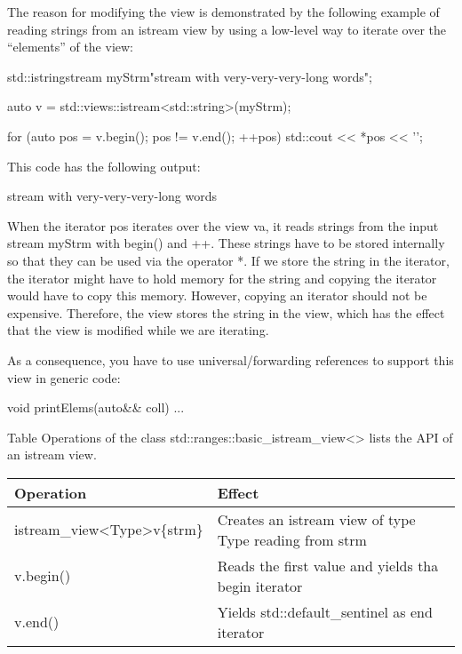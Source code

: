 The reason for modifying the view is demonstrated by the following example of reading strings from an istream view by using a low-level way to iterate over the “elements” of the view:

\begin{cpp}
std::istringstream myStrm{"stream with very-very-very-long words"};

auto v = std::views::istream<std::string>(myStrm);

for (auto pos = v.begin(); pos != v.end(); ++pos) {
	std::cout << *pos << '\n';
}
\end{cpp}

This code has the following output:

\begin{shell}
stream
with
very-very-very-long
words
\end{shell}

When the iterator pos iterates over the view va, it reads strings from the input stream myStrm with begin() and ++. These strings have to be stored internally so that they can be used via the operator *. If we store the string in the iterator, the iterator might have to hold memory for the string and copying the iterator would have to copy this memory. However, copying an iterator should not be expensive. Therefore, the view stores the string in the view, which has the effect that the view is modified while we are iterating.

As a consequence, you have to use universal/forwarding references to support this view in generic code:

\begin{cpp}
void printElems(auto&& coll) {
	...
}
\end{cpp}


Table Operations of the class std::ranges::basic\_istream\_view<> lists the API of an istream view.

\begin{longtable}[c]{|l|l|}
\hline
\textbf{Operation} & \textbf{Effect}                                     \\ \hline
\endfirsthead
%
\endhead
%
istream\_view\textless{}Type\textgreater v\{strm\} & Creates an istream view of type Type reading from strm \\ \hline
v.begin()          & Reads the first value and yields tha begin iterator \\ \hline
v.end()            & Yields std::default\_sentinel as end iterator       \\ \hline
\end{longtable}

